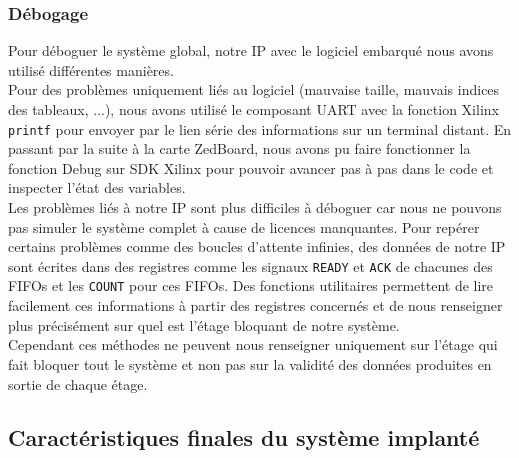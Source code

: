 \subsubsection{Débogage}
Pour déboguer le système global, notre IP avec le logiciel embarqué nous avons
utilisé différentes manières. \\
Pour des problèmes uniquement liés au logiciel (mauvaise taille, mauvais indices
des tableaux, ...),
nous avons utilisé le composant
UART avec la fonction Xilinx \texttt{printf} pour envoyer par le lien série des
informations sur un terminal distant. En passant par la suite à la carte ZedBoard,
nous avons pu faire fonctionner la fonction Debug sur SDK Xilinx pour pouvoir
avancer pas à pas dans le code et inspecter l'état des variables. \\
Les problèmes liés à notre IP sont plus difficiles à déboguer car nous ne pouvons
pas simuler le système complet à cause de licences manquantes. Pour repérer
certains problèmes comme des boucles d'attente infinies, des données de
notre IP sont écrites dans des registres comme les signaux \texttt{READY} et
\texttt{ACK} de chacunes des FIFOs et les \texttt{COUNT} pour ces FIFOs. Des
fonctions utilitaires permettent de lire facilement ces informations à partir
des registres concernés et de nous renseigner plus précisément sur quel est
l'étage bloquant de notre système. \\
Cependant ces méthodes ne peuvent nous renseigner uniquement sur l'étage qui
fait bloquer tout le système et non pas sur la validité des données produites
en sortie de chaque étage.

\subsection{Caractéristiques finales du système implanté}


